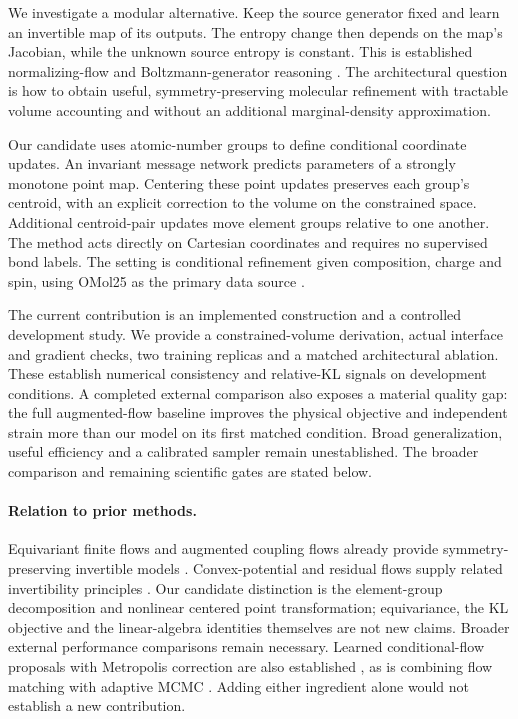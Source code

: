 We investigate a modular alternative. Keep the source generator fixed and learn
an invertible map of its outputs. The entropy change then depends on the map's
Jacobian, while the unknown source entropy is constant. This is established
normalizing-flow and Boltzmann-generator reasoning \citep{noe2019boltzmann}.
The architectural question is how to obtain useful, symmetry-preserving molecular
refinement with tractable volume accounting and without an additional
marginal-density approximation.

Our candidate uses atomic-number groups to define conditional coordinate
updates. An invariant message network predicts parameters of a strongly monotone
point map. Centering these point updates preserves each group's centroid, with
an explicit correction to the volume on the constrained space. Additional
centroid-pair updates move element groups relative to one another. The method
acts directly on Cartesian coordinates and requires no supervised bond labels.
The setting is conditional refinement given composition, charge and spin, using
OMol25 as the primary data source \citep{omol25}.

The current contribution is an implemented construction and a controlled
development study. We provide a constrained-volume derivation, actual interface
and gradient checks, two training replicas and a matched architectural ablation.
These establish numerical consistency and relative-KL signals on development
conditions. A completed external comparison also exposes a material quality
gap: the full augmented-flow baseline improves the physical objective and
independent strain more than our model on its first matched condition. Broad
generalization, useful efficiency and a calibrated sampler remain unestablished.
The broader comparison and remaining scientific gates are stated below.

\paragraph{Relation to prior methods.}
Equivariant finite flows and augmented coupling flows already provide
symmetry-preserving invertible models \citep{bose2021equivariantfinite,midgley2023eacf}.
Convex-potential and residual flows supply related invertibility principles
\citep{huang2020convex,chen2019residual}. Our candidate distinction is the
element-group decomposition and nonlinear centered point transformation;
equivariance, the KL objective and the linear-algebra identities themselves
are not new claims. Broader external performance comparisons remain necessary.
Learned conditional-flow proposals with Metropolis correction are also established
\citep{klein2023timewarp}, as is combining flow matching with adaptive MCMC
\citep{cabezas2024markovian}. Adding either ingredient alone would not establish
a new contribution.

